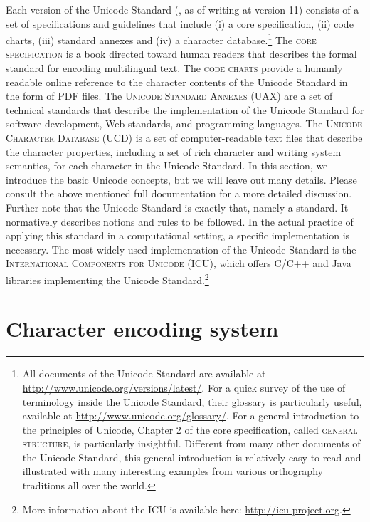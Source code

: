 Each version of the Unicode Standard (\citealp{Unicode2018}, as of writing at
version 11) consists of a set of specifications and guidelines that include (i) a
core specification, (ii) code charts, (iii) standard annexes and (iv) a
character database.\footnote{All documents of the Unicode Standard are available
at \url{http://www.unicode.org/versions/latest/}. For a quick survey of the use
of terminology inside the Unicode Standard, their glossary is particularly
useful, available at \url{http://www.unicode.org/glossary/}. For a general
introduction to the principles of Unicode, Chapter 2 of the core specification,
called \textsc{general structure}, is particularly insightful. Different from
many other documents of the Unicode Standard, this general introduction is
relatively easy to read and illustrated with many interesting examples from
various orthography traditions all over the world.} The \textsc{core
specification} is a book directed toward human readers that describes the formal
standard for encoding multilingual text. The \textsc{code charts} provide a
humanly readable online reference to the character contents of the Unicode
Standard in the form of PDF files. The \textsc{Unicode Standard Annexes (UAX)}
are a set of technical standards that describe the implementation of the Unicode
Standard for software development, Web standards, and programming languages.
The \textsc{Unicode Character Database (UCD)} is a set of computer-readable text
files that describe the character properties, including a set of rich character
and writing system semantics, for each character in the Unicode Standard. In
this section, we introduce the basic Unicode concepts, but we will leave out
many details. Please consult the above mentioned full documentation for a more
detailed discussion. Further note that the Unicode Standard is exactly that,
namely a standard. It normatively describes notions and rules to be followed. In
the actual practice of applying this standard in a computational setting, a
specific implementation is necessary. The most widely used implementation of the
Unicode Standard is the \textsc{International Components for Unicode (ICU)},
which offers C/C++ and Java libraries implementing the Unicode
Standard.\footnote{More information about the ICU is available here:
\url{http://icu-project.org}.}

\section{Character encoding system}
\label{character-encoding-system}

